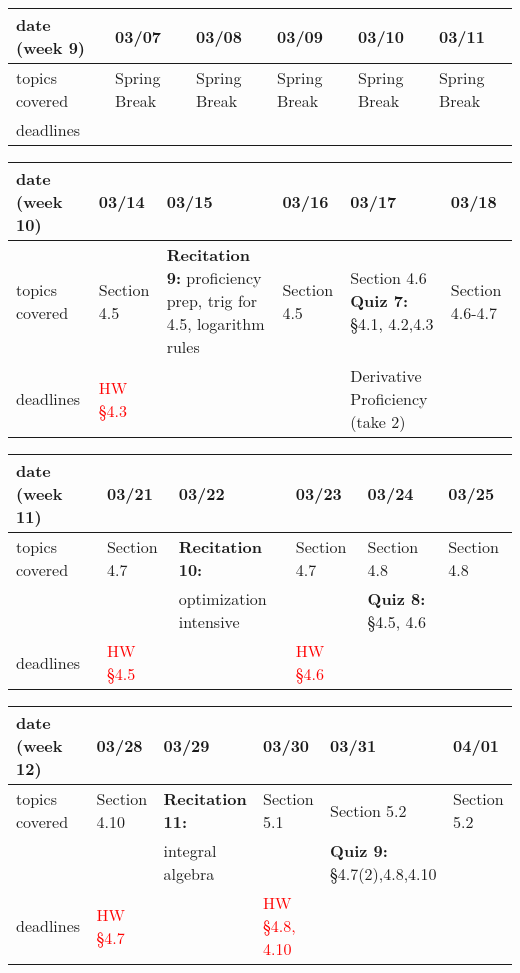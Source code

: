 \documentclass[11pt,fleqn]{article}
\begin{document}
\vfill
\begin{tabularx}{\textwidth}{|X|| X | X | X | X | X |}
\hline
\rowcolor{gray!20}
date (week 9)&03/07&03/08&03/09&03/10&03/11\\ \hline
topics covered&Spring Break&Spring Break&Spring Break&Spring Break&Spring Break\\  \hline
deadlines&&&&& \\  \hline
\end{tabularx}
\vfill
\begin{tabularx}{\textwidth}{|X|| X | X | X | X | X |}
\hline
\rowcolor{gray!20}
date (week 10)&03/14&03/15&03/16&03/17&03/18\\ \hline
topics covered&Section 4.5&\textbf{Recitation 9:} proficiency prep, trig for 4.5, logarithm rules&Section 4.5&Section 4.6 \textbf{Quiz 7:} \S 4.1, 4.2,4.3&Section 4.6-4.7\\  \hline
deadlines&\textcolor{red}{HW \S 4.3}&&&\textcolor{dcyan}{Derivative Proficiency (take 2)}&\\ \hline 
\end{tabularx}
\vfill
\begin{tabularx}{\textwidth}{|X|| X | X | X | X | X |}
\hline
\rowcolor{gray!20}
date (week 11)&03/21&03/22&03/23&03/24&03/25\\ \hline
topics covered&Section 4.7&\textbf{Recitation 10:}&Section 4.7&Section 4.8&Section 4.8\\ 
&&optimization intensive&&\textbf{Quiz 8:} \: \quad \S 4.5, 4.6&\\ \hline
deadlines&\textcolor{red}{HW \S 4.5}&&\textcolor{red}{HW \S 4.6}&& \\ \hline 
\end{tabularx}
\vfill
\begin{tabularx}{\textwidth}{|X|| X | X | X | X | X |}
\hline
\rowcolor{gray!20}
date (week 12)&03/28&03/29&03/30&03/31&04/01\\ \hline
topics covered&Section 4.10&\textbf{Recitation 11:}&Section 5.1&Section 5.2&Section 5.2\\ 
&&integral algebra&&\textbf{Quiz 9:} \S4.7(2),4.8,4.10&\\ \hline
deadlines&\textcolor{red}{HW \S 4.7}&&\textcolor{red}{HW \S 4.8, 4.10}&& \\ \hline
\end{tabularx}
\vfill
\newpage
\end{document}
